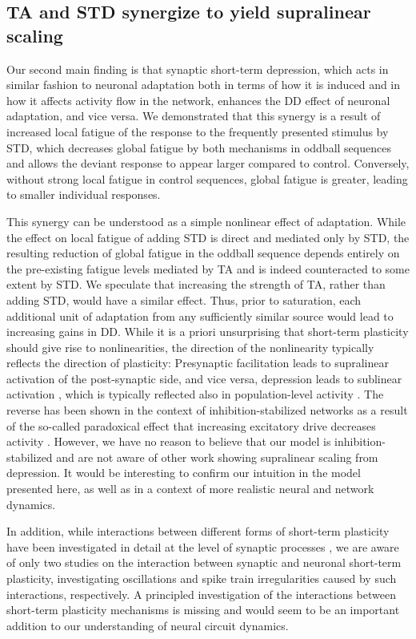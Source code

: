 \documentclass[9pt,lineno,onehalfspacing]{elife}
\begin{document}
\subsection{TA and STD synergize to yield supralinear scaling}

Our second main finding is that synaptic short-term depression, which acts in similar fashion to neuronal adaptation both in terms of how it is induced and in how it affects activity flow in the network, enhances the DD effect of neuronal adaptation, and vice versa. We demonstrated that this synergy is a result of increased local fatigue of the response to the frequently presented stimulus by STD, which decreases global fatigue by both mechanisms in oddball sequences and allows the deviant response to appear larger compared to control. Conversely, without strong local fatigue in control sequences, global fatigue is greater, leading to smaller individual responses.

This synergy can be understood as a simple nonlinear effect of adaptation. While the effect on local fatigue of adding STD is direct and mediated only by STD, the resulting reduction of global fatigue in the oddball sequence depends entirely on the pre-existing fatigue levels mediated by TA and is indeed counteracted to some extent by STD. We speculate that increasing the strength of TA, rather than adding STD, would have a similar effect. Thus, prior to saturation, each additional unit of adaptation from any sufficiently similar source would lead to increasing gains in DD. While it is a priori unsurprising that short-term plasticity should give rise to nonlinearities, the direction of the nonlinearity typically reflects the direction of plasticity: Presynaptic facilitation leads to supralinear activation of the post-synaptic side, and vice versa, depression leads to sublinear activation \citep{Tsodyks1997-qt, Varela1997-nr}, which is typically reflected also in population-level activity \citep{Tsodyks1998-bq}. The reverse has been shown in the context of inhibition-stabilized networks \citep{Wu2023-aa} as a result of the so-called paradoxical effect that increasing excitatory drive decreases activity \citep{Tsodyks1997-hr, Sanzeni2020-su}. However, we have no reason to believe that our model is inhibition-stabilized and are not aware of other work showing supralinear scaling from depression. It would be interesting to confirm our intuition in the model presented here, as well as in a context of more realistic neural and network dynamics.

In addition, while interactions between different forms of short-term plasticity have been investigated in detail at the level of synaptic processes \citep{Tsodyks1997-qt, Varela1997-nr, Buonomano1998-hf, Hennig2008-sc, Anwar2017-qg, Mondal2022-av}, we are aware of only two studies on the interaction between synaptic and neuronal short-term plasticity, investigating oscillations \citep{Mejias2011-rv} and spike train irregularities \citep{Ileri2015-eu} caused by such interactions, respectively. A principled investigation of the interactions between short-term plasticity mechanisms is missing and would seem to be an important addition to our understanding of neural circuit dynamics.
\end{document}
